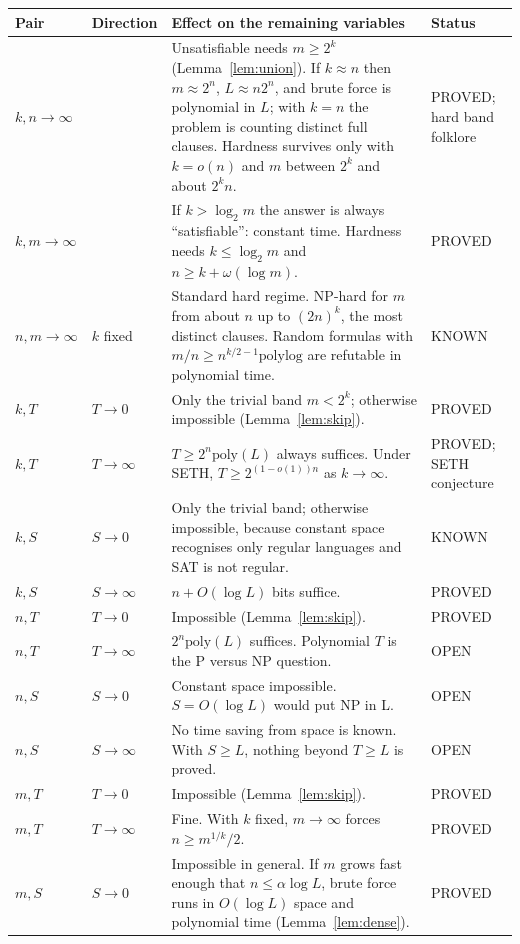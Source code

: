 \documentclass[11pt]{article}
\begin{document}
\begin{longtable}{p{2.1cm}p{1.6cm}p{8.6cm}p{2.3cm}}
\toprule
Pair & Direction & Effect on the remaining variables & Status\\\midrule
\endhead
$k,n\to\infty$ & & Unsatisfiable needs $m\ge2^{k}$ (Lemma~\ref{lem:union}). If $k\approx n$ then $m\approx2^{n}$, $L\approx n2^{n}$, and brute force is polynomial in $L$; with $k=n$ the problem is counting distinct full clauses. Hardness survives only with $k=o(n)$ and $m$ between $2^{k}$ and about $2^{k}n$. & PROVED; hard band folklore\\
$k,m\to\infty$ & & If $k>\log_2m$ the answer is always ``satisfiable'': constant time. Hardness needs $k\le\log_2m$ and $n\ge k+\omega(\log m)$. & PROVED\\
$n,m\to\infty$ & $k$ fixed & Standard hard regime. NP-hard for $m$ from about $n$ up to $(2n)^{k}$, the most distinct clauses. Random formulas with $m/n\ge n^{k/2-1}\mathrm{polylog}$ are refutable in polynomial time. & KNOWN\\
$k,T$ & $T\to0$ & Only the trivial band $m<2^{k}$; otherwise impossible (Lemma~\ref{lem:skip}). & PROVED\\
$k,T$ & $T\to\infty$ & $T\ge2^{n}\mathrm{poly}(L)$ always suffices. Under SETH, $T\ge2^{(1-o(1))n}$ as $k\to\infty$. & PROVED; SETH conjecture\\
$k,S$ & $S\to0$ & Only the trivial band; otherwise impossible, because constant space recognises only regular languages and SAT is not regular. & KNOWN\\
$k,S$ & $S\to\infty$ & $n+O(\log L)$ bits suffice. & PROVED\\
$n,T$ & $T\to0$ & Impossible (Lemma~\ref{lem:skip}). & PROVED\\
$n,T$ & $T\to\infty$ & $2^{n}\mathrm{poly}(L)$ suffices. Polynomial $T$ is the P versus NP question. & OPEN\\
$n,S$ & $S\to0$ & Constant space impossible. $S=O(\log L)$ would put NP in L. & OPEN\\
$n,S$ & $S\to\infty$ & No time saving from space is known. With $S\ge L$, nothing beyond $T\ge L$ is proved. & OPEN\\
$m,T$ & $T\to0$ & Impossible (Lemma~\ref{lem:skip}). & PROVED\\
$m,T$ & $T\to\infty$ & Fine. With $k$ fixed, $m\to\infty$ forces $n\ge m^{1/k}/2$. & PROVED\\
$m,S$ & $S\to0$ & Impossible in general. If $m$ grows fast enough that $n\le\alpha\log L$, brute force runs in $O(\log L)$ space and polynomial time (Lemma~\ref{lem:dense}). & PROVED\\

\end{longtable}
\end{document}
